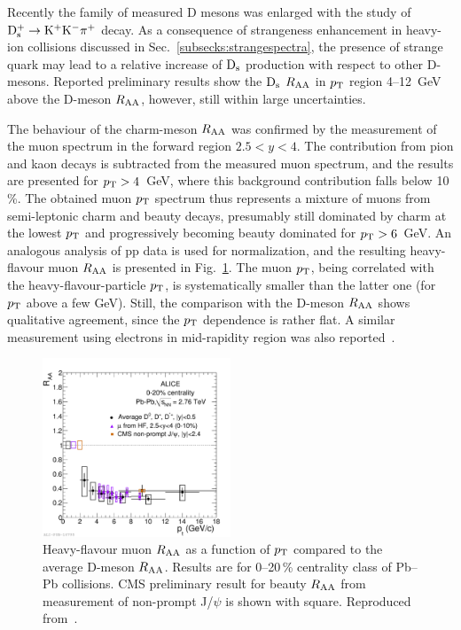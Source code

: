 Recently the family of measured D mesons was enlarged with the study of ${\rm D}_{\rm s}^+ \rightarrow {\rm K}^+{\rm K}^-\pi^+$ decay. As a consequence of strangeness enhancement in heavy-ion collisions discussed in Sec.~\ref{subsecks:strangespectra}, the presence of strange quark may lead to a relative increase of ${\rm D}_{\rm s}$ production with respect to other D-mesons. Reported preliminary results show the ${\rm D}_{\rm s}$ $R_{\rm AA}$ in $p_{\rm T}$ region 4--12~GeV above the D-meson $R_{\rm AA}$, however, still within large uncertainties.

The behaviour of the charm-meson $R_{\rm AA}$ was confirmed by the measurement of the muon spectrum in the forward region $2.5 < y < 4$. The contribution from pion and kaon decays is subtracted from the measured muon spectrum, and the results are presented for $p_{\rm T} > 4$~GeV, where this background contribution falls below 10\,\%. The obtained muon $p_{\rm T}$ spectrum thus represents a mixture of muons from semi-leptonic charm and beauty decays, presumably still dominated by charm at the lowest $p_{\rm T}$ and progressively becoming beauty dominated for $p_{\rm T} > 6$~GeV. An analogous  analysis of pp data is used for normalization, and the resulting heavy-flavour muon $R_{\rm AA}$ is presented in Fig.~\ref{figks:HFmuonRAA}. The muon $p_{\rm T}$, being correlated with the heavy-flavour-particle $p_{\rm T}$, is systematically smaller than the latter one (for $p_{\rm T}$ above a few GeV). Still, the comparison with the D-meson $R_{\rm AA}$ shows qualitative agreement, since the $p_{\rm T}$ dependence is rather flat. A similar measurement using electrons in mid-rapidity region was also reported~\cite{Abelev:2012xe}.

\begin{figure}
\centering
\includegraphics[width=0.5\textwidth]{ksfigures/DmesonHFmuonBRAA.pdf}
\caption{Heavy-flavour muon $R_{\rm AA}$ as a function of $p_{\rm T}$ compared to the average D-meson $R_{\rm AA}$. Results are for 0--20\,\% centrality class of Pb--Pb collisions. CMS preliminary result for beauty $R_{\rm AA}$ from measurement of non-prompt J/$\psi$ is shown with square. Reproduced from~\cite{}.}
\label{figks:HFmuonRAA}
\end{figure}


